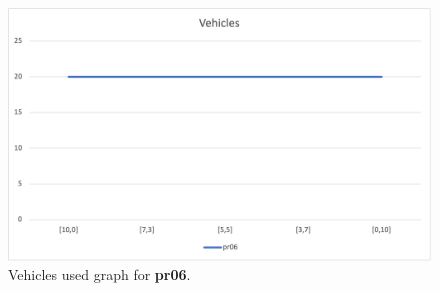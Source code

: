 \begin{figure}[H]
    \centering
    \includegraphics[height=0.25\textheight]{../graphs/pr06-vehicles.png}
    \caption{Vehicles used graph for \textbf{pr06}.}
\end{figure}

\newpage